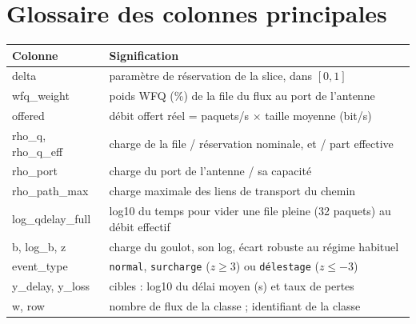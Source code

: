 \documentclass[11pt,a4paper]{article}
\newcommand{\f}[1]{\texttt{#1}}
\begin{document}
\section{Glossaire des colonnes principales}
\begin{tabularx}{\linewidth}{@{}>{\ttfamily}p{3.4cm}X@{}}
\toprule
\normalfont\bfseries Colonne & \bfseries Signification\\
\midrule
delta & paramètre de réservation de la slice, dans $[0,1]$\\
wfq\_weight & poids WFQ (\%) de la file du flux au port de l'antenne\\
offered & débit offert réel = paquets/s $\times$ taille moyenne (bit/s)\\
rho\_q, rho\_q\_eff & charge de la file / réservation nominale, et / part effective\\
rho\_port & charge du port de l'antenne / sa capacité\\
rho\_path\_max & charge maximale des liens de transport du chemin\\
log\_qdelay\_full & log10 du temps pour vider une file pleine (32 paquets) au débit effectif\\
b, log\_b, z & charge du goulot, son log, écart robuste au régime habituel\\
event\_type & \f{normal}, \f{surcharge} ($z\ge3$) ou \f{délestage} ($z\le-3$)\\
y\_delay, y\_loss & cibles : log10 du délai moyen (s) et taux de pertes\\
w, row & nombre de flux de la classe ; identifiant de la classe\\
\bottomrule
\end{tabularx}
\end{document}
